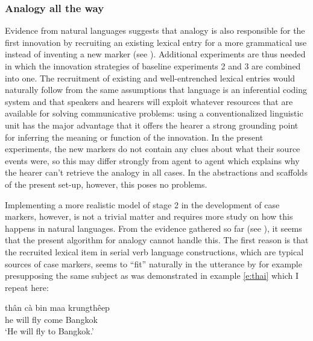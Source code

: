 \subsubsection{Analogy all the way}
 Evidence from natural languages suggests that analogy is also responsible for the first innovation by recruiting an existing lexical entry for a more grammatical use instead of inventing a new marker (see ). Additional experiments are thus needed in which the innovation strategies of baseline experiments 2 and 3 are combined into one. The recruitment of existing and well-entrenched lexical entries would naturally follow from the same assumptions that language is an inferential coding system and that speakers and hearers will exploit whatever resources that are available for solving communicative problems: using a conventionalized linguistic unit has the major advantage that it offers the hearer a strong grounding point for inferring the meaning or function of the innovation. In the present experiments, the new markers do not contain any clues about what their source events were, so this may differ strongly from agent to agent which explains why the hearer can't retrieve the analogy in all cases. In the abstractions and scaffolds of the present set-up, however, this poses no problems.

Implementing a more realistic model of stage 2 in the development of case markers, however, is not a trivial matter and requires more study on how this happens in natural languages. From the evidence gathered so far (see ), it seems that the present algorithm for analogy cannot handle this. The first reason is that the recruited lexical item in serial verb language constructions, which are typical sources of case markers, seems to ``fit'' naturally in the utterance by for example presupposing the same subject as was demonstrated in example \ref{e:thai} which I repeat here: 

\ea
\gll th\^{a}n c\`{a} bin maa krungth\^{e}ep \\
he will fly come Bangkok \\
\glt `He will fly to Bangkok.' \\
\citep[163]{blake94case}
\z


